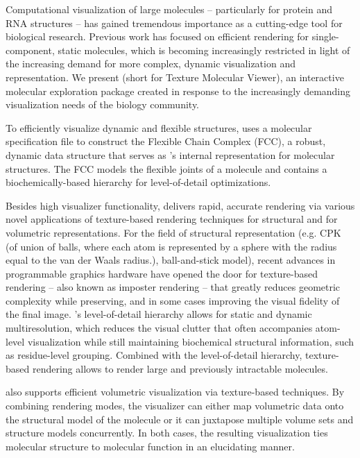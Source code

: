 
Computational visualization of large molecules -- particularly for
protein and RNA structures -- has gained tremendous importance as a
cutting-edge tool for biological research.  Previous work has
focused on efficient rendering for single-component, static
molecules, which is becoming increasingly restricted in light of the
increasing demand for more complex, dynamic visualization and
representation.  We present \TexMol (short for Texture Molecular
Viewer), an interactive molecular exploration package created in
response to the increasingly demanding visualization needs of the
biology community.

To efficiently visualize dynamic and flexible structures, \TexMol
uses a molecular specification file to construct the Flexible Chain
Complex (FCC), a robust, dynamic data structure that serves as
\TexMol's internal representation for molecular structures.  The FCC
models the flexible joints of a molecule and contains a
biochemically-based hierarchy for level-of-detail optimizations.

Besides high visualizer functionality, \TexMol delivers rapid,
accurate rendering via various novel applications of texture-based
rendering techniques for structural and for volumetric
representations.  For the field of structural representation (e.g.
CPK (of union of balls, where each atom is represented by a sphere
with the radius equal to the van der Waals radius.), ball-and-stick
model), recent advances in programmable graphics hardware have
opened the door for texture-based rendering -- also known as
imposter rendering -- that greatly reduces geometric complexity
while preserving, and in some cases improving the visual fidelity of
the final image. \TexMol's level-of-detail hierarchy allows for
static and dynamic multiresolution, which reduces the visual clutter
that often accompanies atom-level visualization while still
maintaining biochemical structural information, such as
residue-level grouping.  Combined with the level-of-detail
hierarchy, texture-based rendering allows \TexMol to render large
and previously intractable molecules.

\TexMol also supports efficient volumetric visualization via
texture-based techniques. By combining rendering modes, the
visualizer can either map volumetric data onto the structural model
of the molecule or it can juxtapose multiple volume sets and
structure models concurrently. In both cases, the resulting
visualization ties molecular structure to molecular function in an
elucidating manner.

